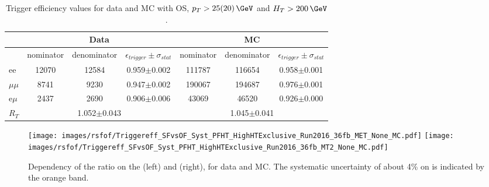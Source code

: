 \begin{table}[ht!]
\def\arraystretch{1.2}
\caption{Trigger efficiency values for data and MC with OS, $p_T>25(20)\,\GeV$ and $H_T>200\,\GeV$.} 
\label{tab:TriggerEffValues}
\begin{center}
\begin{tabular}{l c c c |c c c}  
        \hline \hline
        &\multicolumn{3}{c|}{Data} &\multicolumn{3}{c}{MC} \\\hline
 & nominator & denominator & $\epsilon_{trigger} \pm \sigma_{stat}$ & nominator & denominator & $\epsilon_{trigger} \pm \sigma_{stat}$ \\    
\hline
ee & 12070 & 12584 & 0.959$\pm$0.002 & 111787 & 116654 & 0.958$\pm$0.001 \\
$\mu\mu$ & 8741 & 9230 & 0.947$\pm$0.002 & 190067 & 194687 & 0.976$\pm$0.001 \\
e$\mu$ & 2437 & 2690 & 0.906$\pm$0.006 & 43069 & 46520 & 0.926$\pm$0.000 \\
\hline
$R_{T}$ & \multicolumn{3}{c|}{1.052$\pm$0.043}  & \multicolumn{3}{c}{1.045$\pm$0.041}  \\\hline\hline
\end{tabular}
\end{center}
\end{table}                                                                                                                                           



\begin{figure}[htbp!]
\begin{center}
    \texttt{[image: images/rsfof/Triggereff\_SFvsOF\_Syst\_PFHT\_HighHTExclusive\_Run2016\_36fb\_MET\_None\_MC.pdf]}
    \texttt{[image: images/rsfof/Triggereff\_SFvsOF\_Syst\_PFHT\_HighHTExclusive\_Run2016\_36fb\_MT2\_None\_MC.pdf]}
    \caption{Dependency of the \RT ratio on the \ptmiss (left) and \mttwo (right), for data and MC. The systematic uncertainty of about 4\% on \RT is indicated by the orange band.}
\label{fig:EffDependency}
\end{center}
\end{figure}                                                                                                                                                                              

